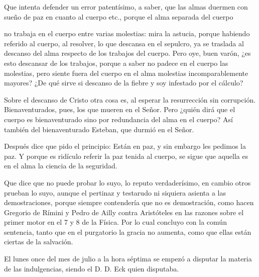 Que intenta defender un error patentísimo, a saber, que las almas duermen con sueño de paz en cuanto al cuerpo etc., porque el alma separada del cuerpo

no trabaja en el cuerpo entre varias molestias: mira la astucia, porque habiendo referido al cuerpo, al resolver, lo que descansa en el sepulcro, ya se traslada al descanso del alma respecto de los trabajos del cuerpo. Pero oye, buen varón, ¿es esto descansar de los trabajos, porque a saber no padece en el cuerpo las molestias, pero siente fuera del cuerpo en el alma molestias incomparablemente mayores? ¿De qué sirve si descanso de la fiebre y soy infestado por el cálculo?

Sobre el descanso de Cristo otra cosa es, al esperar la resurrección sin corrupción. Bienaventurados, pues, los que mueren en el Señor. Pero ¿quién dirá que el cuerpo es bienaventurado sino por redundancia del alma en el cuerpo? Así también del bienaventurado Esteban, que durmió en el Señor.

Después dice que pido el principio: Están en paz, y sin embargo les pedimos la paz. Y porque es ridículo referir la paz tenida al cuerpo, se sigue que aquella es en el alma la ciencia de la seguridad.

Que dice que no puede probar lo suyo, lo reputo verdaderísimo, en cambio otros prueban lo suyo, aunque el pertinaz y testarudo ni siquiera asienta a las demostraciones, porque siempre contendería que no es demostración, como hacen Gregorio de Rímini y Pedro de Ailly contra Aristóteles en las razones sobre el primer motor en el 7 y 8 de la Física. Por lo cual concluyo con la común sentencia, tanto que en el purgatorio la gracia no aumenta, como que ellas están ciertas de la salvación.

El lunes once del mes de julio a la hora séptima se empezó a disputar la materia de las indulgencias, siendo el D. D. Eck quien disputaba.

